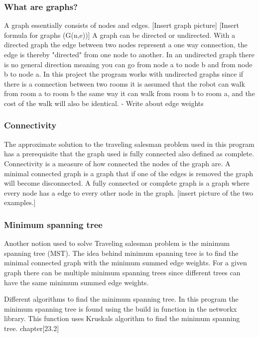 \subsubsection{What are graphs?}
A graph essentially consists of nodes and edges.
[Insert graph picture]
[Insert formula for graphs (G(n,e))]
A graph can be directed or undirected. With a directed graph the edge between two nodes represent a one way connection, the edge is thereby "directed" from one node to another. In an undirected graph there is no general direction meaning you can go from node a to node b and from node b to node a. In this project the program works with undirected graphs since if there is a connection between two rooms it is assumed that the robot can walk from room a to room b the same way it can walk from room b to room a, and the cost of the walk will also be identical. \cite{bondy1976graph}
- Write about edge weights

\subsubsection{Connectivity}
The approximate solution to the traveling salesman problem used in this program has a prerequisite that the graph used is fully connected also defined as complete.  
Connectivity is a measure of how connected the nodes of the graph are. A minimal connected graph is a graph that if one of the edges is removed the graph will become disconnected. A fully connected or complete graph is a graph where every node has a edge to every other node in the graph. [insert picture of the two examples.] \cite{bondy1976graph}


\subsubsection{Minimum spanning tree}
Another notion used to solve Traveling salesman problem is the minimum spanning tree (MST). The idea behind minimum spanning tree is to find the minimal connected graph with the minimum summed edge weights. For a given graph there can be \cite{hej} multiple minimum spanning trees since different trees can have the same minimum summed edge weights.\cite{cormen2009introduction}



Different algorithms to find the minimum spanning tree. In this program the minimum spanning tree is found using the build in function in the networkx library. This function uses Kruskals algorithm to find the minimum spanning tree. chapter[23.2]\cite{cormen2009introduction}



